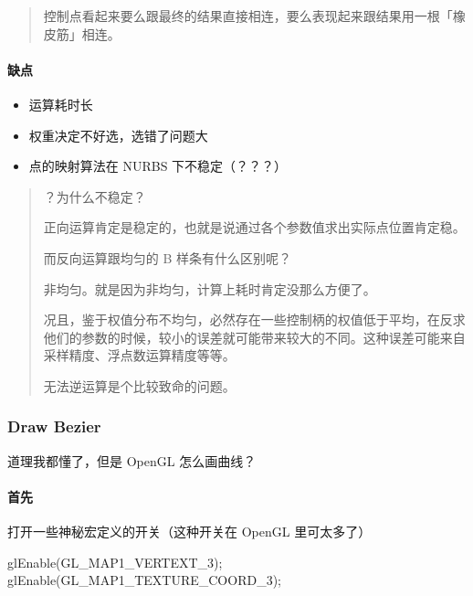 \documentclass[
]{article}
\newenvironment{Shaded}{}{}
\newcommand{\NormalTok}[1]{#1}
\begin{document}
\begin{quote}
控制点看起来要么跟最终的结果直接相连，要么表现起来跟结果用一根「橡皮筋」相连。
\end{quote}

\hypertarget{header-n28}{%
\paragraph{缺点}\label{header-n28}}

\begin{itemize}
\item
  运算耗时长
\item
  权重决定不好选，选错了问题大
\item
  点的映射算法在 NURBS 下不稳定（？？？）
\end{itemize}

\begin{quote}
？为什么不稳定？

正向运算肯定是稳定的，也就是说通过各个参数值求出实际点位置肯定稳。

而反向运算跟均匀的 B 样条有什么区别呢？

非均匀。就是因为非均匀，计算上耗时肯定没那么方便了。

况且，鉴于权值分布不均匀，必然存在一些控制柄的权值低于平均，在反求他们的参数的时候，较小的误差就可能带来较大的不同。这种误差可能来自采样精度、浮点数运算精度等等。

无法逆运算是个比较致命的问题。
\end{quote}

\hypertarget{header-n43}{%
\subsubsection{Draw Bezier}\label{header-n43}}

道理我都懂了，但是 OpenGL 怎么画曲线？

\hypertarget{header-n45}{%
\paragraph{首先}\label{header-n45}}

打开一些神秘宏定义的开关（这种开关在 OpenGL 里可太多了）

\begin{Shaded}
\begin{Highlighting}[]
\NormalTok{glEnable(GL_MAP1_VERTEXT_3);}
\NormalTok{glEnable(GL_MAP1_TEXTURE_COORD_3);}
\end{Highlighting}
\end{Shaded}
\end{document}
